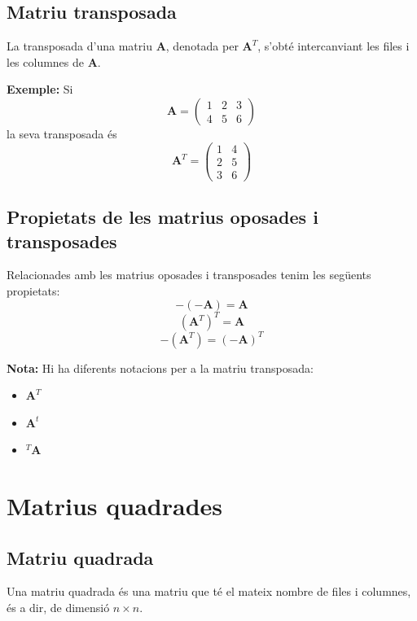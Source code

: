 \documentclass[12pt]{article}
\newcommand{\mat}[1]{\mathbf{#1}}
\begin{document}
\subsection{Matriu transposada}
\begin{concept}
La transposada d'una matriu $\mat{A}$, denotada per $\mat{A}^T$, s'obté intercanviant les files i les columnes de $\mat{A}$.

\textbf{Exemple:}
Si
\[
\mat{A} = \begin{pmatrix}
1 & 2 & 3 \\
4 & 5 & 6
\end{pmatrix}
\]
la seva transposada és
\[
\mat{A}^T = \begin{pmatrix}
1 & 4 \\
2 & 5 \\
3 & 6
\end{pmatrix}
\]
\end{concept}

\subsection{Propietats de les matrius oposades i transposades}
\begin{concept}
Relacionades amb les matrius oposades i transposades tenim les següents propietats:
\[
-(-\mat{A}) = \mat{A}
\]
\[
(\mat{A}^T)^T = \mat{A}
\]
\[
-(\mat{A}^T) = (-\mat{A})^T
\]

\textbf{Nota:} Hi ha diferents notacions per a la matriu transposada:
\begin{itemize}
    \item $\mat{A}^T$
    \item $\mat{A}^t$
    \item $^T\mat{A}$
\end{itemize}
\end{concept}

\section{Matrius quadrades}

\subsection{Matriu quadrada}
\begin{concept}
Una matriu quadrada és una matriu que té el mateix nombre de files i columnes, és a dir, de dimensió $n \times n$.
\end{concept}
\end{document}
